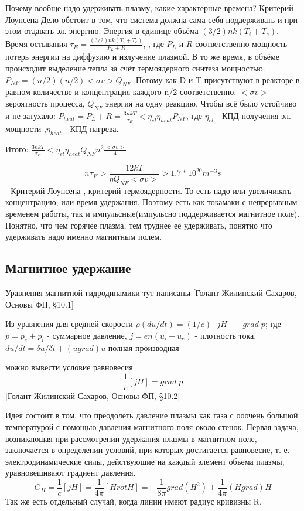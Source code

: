 \documentclass[10pt, a4paper]{article}
\begin{document}
Почему вообще надо удерживать плазму, какие характерные времена? Критерий Лоунсена 
Дело обстоит в том, что система должна сама себя поддерживать и при этом отдавать эл. энергию. Энергия в единице объёма $(3/2)nk(T_i+T_e)$. Время остывания $\tau_E = \frac { (3/2)nk(T_i+T_e) }{P_L+R}$, , где $P_L$ и $R$ соответственно мощность потерь энергии на диффузию и излучение плазмой. В то же время, в объёме происходит выделение тепла за счёт термоядерного синтеза мощностью. $P_{NF}=(n/2)(n/2)<\sigma v> Q_{NF} $. Потому
 как D и T присутствуют в реакторе в равном количестве и концентрация каждого n/2 соответственно. $<\sigma v> $ - вероятность процесса,   $Q_{NF} $ энергия на одну реакцию.
Чтобы всё было устойчиво и не затухало: $P_{heat}=P_L + R = \frac{3nkT}{\tau_E} < \eta_{el} \eta_{heat} P_{NF} $, где $\eta_{el} $ - КПД получения эл. мощности ,$ \eta_{heat} $ - КПД нагрева.

Итого: $ \frac{3nkT}{\tau_E} < \eta_{el} \eta_{heat} Q_{NF} n^{2} \frac{<\sigma v>}{4}$

\begin{equation}
	n \tau_E > \frac{12 kT}{\eta Q_{NF} <\sigma v>} > 1.7*10^{20} m^{-3} s
\end{equation}
 - Критерий Лоунсена , критерий термоядерности. То есть надо или увеличивать концентрацию, или время удержания. Поэтому есть как токамаки с непрерывным временем работы, так и импульсные(импульсно поддерживается магнитное поле).
Понятно, что чем горячее плазма, тем труднее её удерживать, понятно что удерживать надо именно магнитным полем.

\subsection{Магнитное удержание}

Уравнения магнитной гидродинамики тут написаны [Голант Жилинский Сахаров, Основы ФП,  §10.1]

Из уравнения для средней скорости $\rho (du/dt)=(1/c)[j H]-grad\;p$; где $p=p_e+p_i$ - суммарное давление, $j=en(u_i+u_e)$ - плотность тока, $ du/dt=\delta u / \delta t + (u grad)u$ полная производная

можно вывести условие равновесия
\begin{equation}
	\frac{1}{c}[j H]=grad\;p
\end{equation}
[Голант Жилинский Сахаров, Основы ФП,  §10.2]


Идея состоит в том, что преодолеть давление плазмы как газа с ооочень большой температурой с помощью давления магнитного поля около стенок.
Первая задача, возникающая при рассмотрении удержания плазмы в магнитном поле, заключается в определении условий, при которых достигается равновесие, т. е. электродинамические силы, действующие на каждый элемент объема плазмы, уравновешивают градиент давления.
\begin{equation}
	G_H=\frac{1}{c} [j H]=\frac{1}{4 \pi} [H rotH]=-\frac{1}{8 \pi} grad(H^{2})+\frac{1}{4 \pi} (H grad) H
\end{equation}
Так же есть отдельный случай, когда линии имеют радиус кривизны R.
\end{document}
